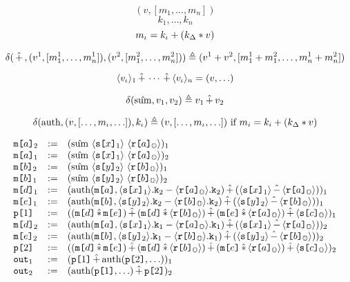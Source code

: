 $$
(v, [m_1,\ldots,m_n])
$$
$$
k_1,\ldots,k_n
$$
$$
m_\iota = k_\iota + (k_\Delta * v)
$$

$$
\delta(\,\hat{+}\,,(v^1, [m_1^1,\ldots,m^1_n]),(v^2, [m_1^2,\ldots,m^2_n]))
\triangleq
(v^1 + v^2, [m_1^1 + m_1^2 ,\ldots,m^1_n + m_n^2])
$$

$$
\langle v_{\iota} \rangle_{1} \,\hat{+}\, \cdots \,\hat{+}\, \langle v_{\iota} \rangle_{n} =
(v,\ldots)
$$

$$
\delta(\hat{\mathrm{sum}},v_1,v_2) \triangleq v_1 \,\hat{+}\, v_2
$$

$$
\delta(\mathrm{auth}, (v, [\ldots,m_\iota,\ldots]), k_\iota) \triangleq
     (v, [\ldots,m_\iota,\ldots]) \text{\ if\ } m_i = k_i + (k_\Delta * v)
$$

$$
\begin{array}{lcl}
  \elab{\mesg{a}}{2} &:=&
  \elab{(\macotp\ \macv{\elab{\secret{x}}{1}}\ \macv{\elab{\flip{a}}{\Oracle}})}{1}\\
  \elab{\mesg{a}}{1} &:=&
  \elab{(\macotp\ \macv{\elab{\secret{x}}{1}}\ \macv{\elab{\flip{a}}{\Oracle}})}{2}\\
  \elab{\mesg{b}}{2} &:=&
  \elab{(\macotp\ \macv{\elab{\secret{y}}{2}}\ \macv{\elab{\flip{b}}{\Oracle}})}{1}\\
  \elab{\mesg{b}}{1} &:=&
  \elab{(\macotp\ \macv{\elab{\secret{y}}{2}}\ \macv{\elab{\flip{b}}{\Oracle}})}{2}\\
  \elab{\mesg{d}}{1} &:=&
  \elab{(\macauth(\mesg{a}, \mack{\elab{\secret{x}}{1}}{2} \fminus \mack{\elab{\flip{a}}{\Oracle}}{2}) \macplus (\macv{\elab{\secret{x}}{1}}\macminus\macv{\elab{\flip{a}}{\Oracle}}))}{1}\\
  \elab{\mesg{e}}{1}&:=&
  \elab{(\macauth(\mesg{b}, \mack{\elab{\secret{y}}{2}}{2} \fminus \mack{\elab{\flip{b}}{\Oracle}}{2}) \macplus (\macv{\elab{\secret{y}}{2}}\macminus\macv{\elab{\flip{b}}{\Oracle}}))}{1}\\
  \rvl{1} &:=&
  \elab{( (\mesg{d} \mactimes \mesg{e}) \macplus
          (\mesg{d} \mactimes \macv{\elab{\flip{b}}{\Oracle}}) \macplus
          (\mesg{e} \mactimes \macv{\elab{\flip{a}}{\Oracle}}) \macplus \macv{\elab{\secret{c}}{\Oracle}}
    )}{1}\\
  \elab{\mesg{d}}{2} &:=&
  \elab{(\macauth(\mesg{a}, \mack{\elab{\secret{x}}{1}}{1} \fminus \mack{\elab{\flip{a}}{\Oracle}}{1}) \macplus (\macv{\elab{\secret{x}}{1}}\macminus\macv{\elab{\flip{a}}{\Oracle}}))}{2}\\
  \elab{\mesg{e}}{2}&:=&
  \elab{(\macauth(\mesg{b}, \mack{\elab{\secret{y}}{2}}{1} \fminus \mack{\elab{\flip{b}}{\Oracle}}{1}) \macplus (\macv{\elab{\secret{y}}{2}}\macminus\macv{\elab{\flip{b}}{\Oracle}}))}{2}\\
  \rvl{2} &:=&
  \elab{( (\mesg{d} \mactimes \mesg{e}) \macplus
          (\mesg{d} \mactimes \macv{\elab{\flip{b}}{\Oracle}}) \macplus
          (\mesg{e} \mactimes \macv{\elab{\flip{a}}{\Oracle}}) \macplus \macv{\elab{\secret{c}}{\Oracle}}
    )}{2}\\
  \out{1} &:=& \elab{(\rvl{1} \macplus \macauth(\rvl{2},\ldots))}{1} \\
  \out{2} &:=& \elab{(\macauth(\rvl{1},\ldots) \macplus \rvl{2})}{2}
\end{array}
$$


